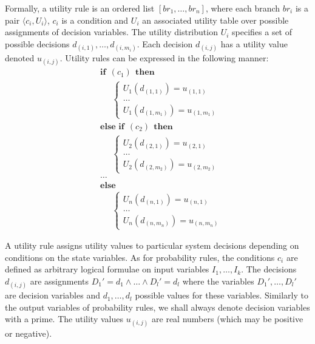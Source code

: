 Formally, a utility rule is an ordered list $[ br_1, \dots, br_n]$, where each branch $br_i$ is a pair $\langle c_i, U_i \rangle$, $c_i$ is a condition and $U_i$ an associated utility table over possible assignments of decision variables. The utility distribution $U_i$ specifies a set of possible decisions $d_{(i,1)}, \dots, d_{(i,m_i)}$.  Each decision $d_{(i,j)}$ has a  utility value denoted $u_{(i,j)}$.  Utility rules can be expressed in the following manner:
\begin{equation}
\begin{aligned}
& \textbf{if} \ \ (c_{1}) \ \ \textbf{then} \\ 
& \;\;\;\;\; \begin{cases}
U_1(d_{(1,1)}) = u_{(1,1)} \\
 \dots \\
U_1(d_{(1,m_1)}) = u_{(1,m_1)} 
\end{cases} \\[3mm]
& \textbf{else if} \ \ (c_{2}) \ \ \textbf{then} \\ 
& \;\;\;\;\; \begin{cases}
U_2(d_{(2,1)}) = u_{(2,1)} \\
 \dots \\
U_2(d_{(2,m_2)}) = u_{(2,m_2)} 
\end{cases} \\
& \dots  \\
& \textbf{else} \\
& \;\;\;\;\; \begin{cases}
U_n(d_{(n,1)}) = u_{(n,1)} \\
 \dots \\
U_n(d_{(n,m_n)}) = u_{(n,m_n)}
\end{cases}
\end{aligned}
\end{equation}

A utility rule assigns utility values to particular system decisions depending on conditions on the state variables.  As for probability rules, the conditions $c_i$ are defined as arbitrary logical formulae on input variables $I_1, \dots, I_k$.  The decisions $d_{(i,j)}$ are assignments $D_1'\!=\!d_1 \land \dots \land D_{l}'\!=\!d_{l}$ where the variables $D_1', \dots, D_{l}'$ are decision variables and $d_1, \dots, d_{l}$ possible values for these variables. Similarly to the output variables of probability rules, we shall always denote decision variables with a prime. The utility values $u_{(i,j)}$ are real numbers (which may be positive or negative).  

